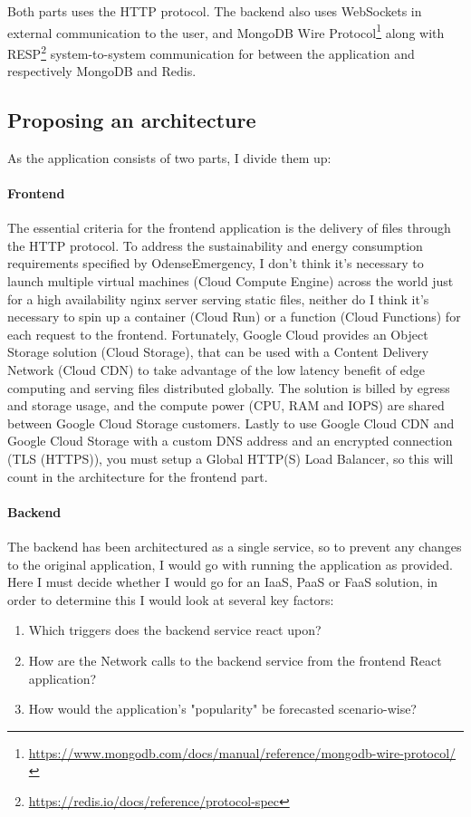 \documentclass[11pt]{article}
\begin{document}
\vspace{.25cm}

Both parts uses the HTTP protocol. The backend also uses WebSockets in external communication to the user, and MongoDB Wire Protocol\footnote{\href{https://www.mongodb.com/docs/manual/reference/mongodb-wire-protocol/}{https://www.mongodb.com/docs/manual/reference/mongodb-wire-protocol/}} along with RESP\footnote{\href{https://redis.io/docs/reference/protocol-spec}{https://redis.io/docs/reference/protocol-spec}} system-to-system communication for between the application and respectively MongoDB and Redis.

\subsection{Proposing an architecture}
As the application consists of two parts, I divide them up:

\paragraph{Frontend}
The essential criteria for the frontend application is the delivery of files through the HTTP protocol. To address the sustainability and energy consumption requirements specified by OdenseEmergency, I don't think it's necessary to launch multiple virtual machines (Cloud Compute Engine) across the world just for a high availability nginx server serving static files, neither do I think it's necessary to spin up a container (Cloud Run) or a function (Cloud Functions) for each request to the frontend. Fortunately, Google Cloud provides an Object Storage solution (Cloud Storage), that can be used with a Content Delivery Network (Cloud CDN) to take advantage of the low latency benefit of edge computing and serving files distributed globally. The solution is billed by egress and storage usage, and the compute power (CPU, RAM and IOPS) are shared between Google Cloud Storage customers. Lastly to use Google Cloud CDN and Google Cloud Storage with a custom DNS address and an encrypted connection (TLS (HTTPS)), you must setup a Global HTTP(S) Load Balancer, so this will count in the architecture for the frontend part.

\paragraph{Backend}
The backend has been architectured as a single service, so to prevent any changes to the original application, I would go with running the application as provided. Here I must decide whether I would go for an IaaS, PaaS or FaaS solution, in order to determine this I would look at several key factors:
\begin{enumerate}
	\item Which triggers does the backend service react upon?
	\item How are the Network calls to the backend service from the frontend React application?
	\item How would the application's "popularity" be forecasted scenario-wise?
\end{enumerate}
\end{document}
